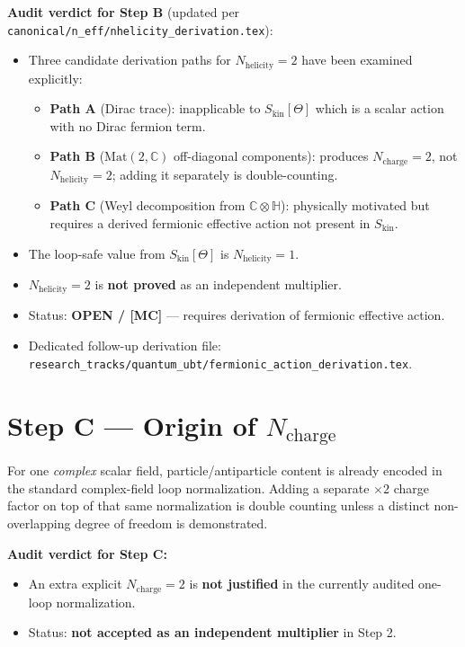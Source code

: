 \documentclass[12pt,a4paper]{article}
\begin{document}
\textbf{Audit verdict for Step B} (updated per \texttt{canonical/n\_eff/nhelicity\_derivation.tex}):
\begin{itemize}
  \item Three candidate derivation paths for $N_{\mathrm{helicity}}=2$ have been
  examined explicitly:
  \begin{itemize}
    \item \textbf{Path A} (Dirac trace): inapplicable to $S_{\mathrm{kin}}[\Theta]$
    which is a scalar action with no Dirac fermion term.
    \item \textbf{Path B} ($\mathrm{Mat}(2,\mathbb{C})$ off-diagonal components):
    produces $N_{\mathrm{charge}}=2$, not $N_{\mathrm{helicity}}=2$;
    adding it separately is double-counting.
    \item \textbf{Path C} (Weyl decomposition from $\mathbb{C}\otimes\mathbb{H}$):
    physically motivated but requires a derived fermionic effective action
    not present in $S_{\mathrm{kin}}$.
  \end{itemize}
  \item The loop-safe value from $S_{\mathrm{kin}}[\Theta]$ is $N_{\mathrm{helicity}}=1$.
  \item $N_{\mathrm{helicity}}=2$ is \textbf{not proved} as an independent multiplier.
  \item Status: \textbf{OPEN / [MC]} — requires derivation of fermionic effective action.
  \item Dedicated follow-up derivation file:
  \texttt{research\_tracks/quantum\_ubt/fermionic\_action\_derivation.tex}.
\end{itemize}

\section{Step C --- Origin of $N_{\mathrm{charge}}$}
For one \emph{complex} scalar field, particle/antiparticle content is already
encoded in the standard complex-field loop normalization. Adding a separate
$\times 2$ charge factor on top of that same normalization is double counting
unless a distinct non-overlapping degree of freedom is demonstrated.

\textbf{Audit verdict for Step C:}
\begin{itemize}
  \item An extra explicit $N_{\mathrm{charge}}=2$ is \textbf{not justified} in the
  currently audited one-loop normalization.
  \item Status: \textbf{not accepted as an independent multiplier} in Step 2.
\end{itemize}
\end{document}
